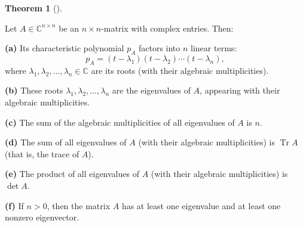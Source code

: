 \documentclass[numbers=enddot,12pt,final,onecolumn,notitlepage]{scrartcl}%
\numberwithin{exer}{subsection}
\theoremstyle{definition}
\newtheorem{theo}{Theorem}[subsection]
\newenvironment{theorem}[1][]
{\begin{theo}[#1]\begin{leftbar}}
{\end{leftbar}\end{theo}}
\begin{document}
\begin{theorem}
\label{thm.schurtri.ch.fta-cons}Let $A\in\mathbb{C}^{n\times n}$ be an
$n\times n$-matrix with complex entries. Then:

\textbf{(a)} Its characteristic polynomial $p_{A}$ factors into $n$ linear
terms:%
\begin{equation}
p_{A}=\left(  t-\lambda_{1}\right)  \left(  t-\lambda_{2}\right)
\cdots\left(  t-\lambda_{n}\right)  , \label{eq.schurtri.ch.pA-factors}%
\end{equation}
where $\lambda_{1},\lambda_{2},\ldots,\lambda_{n}\in\mathbb{C}$ are its roots
(with their algebraic multiplicities). \medskip

\textbf{(b)} These roots $\lambda_{1},\lambda_{2},\ldots,\lambda_{n}$ are the
eigenvalues of $A$, appearing with their algebraic multiplicities. \medskip

\textbf{(c)} The sum of the algebraic multiplicities of all eigenvalues of $A$
is $n$. \medskip

\textbf{(d)} The sum of all eigenvalues of $A$ (with their algebraic
multiplicities) is $\operatorname*{Tr}A$ (that is, the trace of $A$). \medskip

\textbf{(e)} The product of all eigenvalues of $A$ (with their algebraic
multiplicities) is $\det A$. \medskip

\textbf{(f)} If $n>0$, then the matrix $A$ has at least one eigenvalue and at
least one nonzero eigenvector.
\end{theorem}
\end{document}
